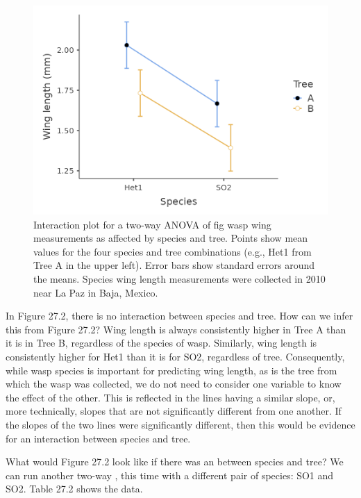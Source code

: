 \documentclass[
  openany]{krantz}
\begin{document}
\begin{figure}
\includegraphics[width=1\linewidth]{img/two-way_ANOVA_no_interaction} \caption{Interaction plot for a two-way ANOVA of fig wasp wing measurements as affected by species and tree. Points show mean values for the four species and tree combinations (e.g., Het1 from Tree A in the upper left). Error bars show standard errors around the means. Species wing length measurements were collected in 2010 near La Paz in Baja, Mexico.}\label{fig:unnamed-chunk-109}
\end{figure}

In Figure 27.2, there is no interaction between species and tree.
How can we infer this from Figure 27.2?
Wing length is always consistently higher in Tree A than it is in Tree B, regardless of the species of wasp.
Similarly, wing length is consistently higher for Het1 than it is for SO2, regardless of tree.
Consequently, while wasp species is important for predicting wing length, as is the tree from which the wasp was collected, we do not need to consider one variable to know the effect of the other.
This is reflected in the lines having a similar slope, or, more technically, slopes that are not significantly different from one another.
If the slopes of the two lines were significantly different, then this would be evidence for an interaction between species and tree.

What would Figure 27.2 look like if there was an  between species and tree?
We can run another two-way , this time with a different pair of species: SO1 and SO2.
Table 27.2 shows the data.
\end{document}
